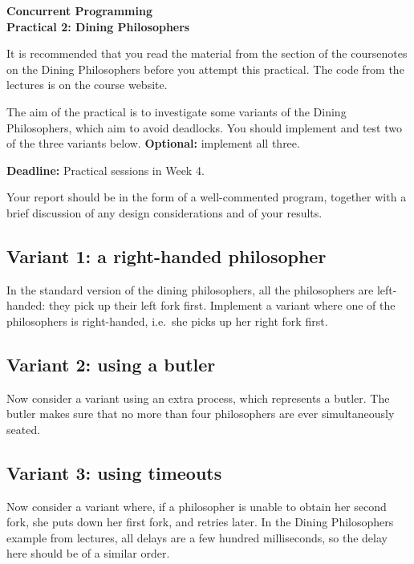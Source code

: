 \documentclass[11pt,a4paper]{article}
\begin{document}
\begin{center}
\LARGE\bf Concurrent Programming \\
Practical 2: Dining Philosophers
\end{center}

It is recommended that you read the material from the section of the
coursenotes on the Dining Philosophers before you attempt this practical.  The
code from the lectures is on the course website.

The aim of the practical is to investigate some variants of the Dining
Philosophers, which aim to avoid deadlocks.  You should implement and
test two of the three variants below.  {\bf Optional:} implement all
three.

\textbf{Deadline:} Practical sessions in Week 4.

Your report should be in the form of a well-commented program, together with
a brief discussion of any design considerations and of your results.


\subsection*{Variant 1: a right-handed philosopher}

In the standard version of the dining philosophers, all the philosophers are
left-handed: they pick up their left fork first.  Implement a variant where
one of the philosophers is right-handed, i.e.\ she picks up her right fork
first. 


\subsection*{Variant 2: using a butler}

Now consider a variant using an extra process, which represents a butler.  The
butler makes sure that no more than four philosophers are ever simultaneously
seated. 


\subsection*{Variant 3: using timeouts}

Now consider a variant where, if a philosopher is unable to obtain her second
fork, she puts down her first fork, and retries later.  
In the Dining Philosophers example from lectures, all delays are a few hundred
milliseconds, so the delay here should be of a similar order.
\end{document}
